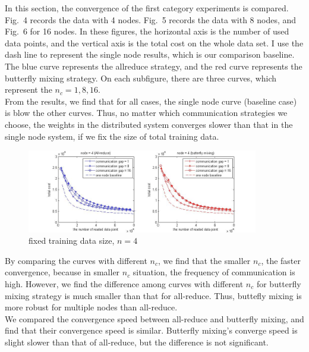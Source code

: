\documentclass{article}
\begin{document}
In this section, the convergence of the first category experiments is compared. Fig.~4 records the data with 4 nodes. Fig.~5 records the data with 8 nodes, and Fig.~6 for 16 nodes. In these figures, the horizontal axis is the number of used data points, and the vertical axis is the total cost on the whole data set. I use the dash line to represent the single node results, which is our comparison baseline. The blue curve represents the allreduce strategy, and the red curve represents the butterfly mixing strategy. On each subfigure, there are three curves, which represent the $n_c = 1 , 8 , 16$. \\

From the results, we find that for all cases, the single node curve (baseline case) is blow the other curves. Thus, no matter which communication strategies we choose, the weights in the distributed system converges slower than that in the single node system, if we fix the size of total training data. 

\begin{center}
\begin{figure}
  
  \centering
    \includegraphics[width=0.9\textwidth]{batch20_node4_fixData.jpg}
    \caption{fixed training data size, $n=4$}

\end{figure}
\end{center}

By comparing the curves with different $n_c$, we find that the smaller $n_c$, the faster convergence, because in smaller $n_c$ situation, the frequency of communication is high. However, we find the difference among curves with different $n_c$ for butterfly mixing strategy is much smaller than that for all-reduce. Thus, buttefly mixing is more robust for multiple nodes than all-reduce. \\  

We compared the convergence speed between all-reduce and butterfly mixing, and find that their convergence speed is similar. Butterfly mixing's converge speed is slight slower than that of all-reduce, but the difference is not significant. \\
\end{document}
